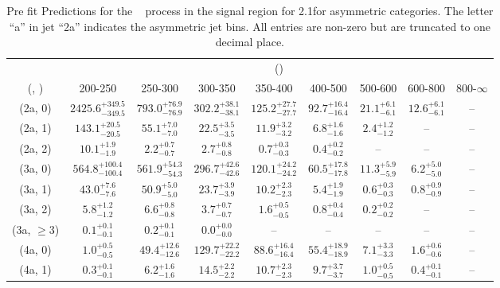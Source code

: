 \begin{table}[h!]
\tiny
\centering
\caption{Pre fit Predictions for the \zInv~ process in the signal region for 2.1\ifb for asymmetric categories. The letter ``a'' in jet \eg ``2a''  indicates the asymmetric jet bins. All entries are non-zero but are truncated to one decimal place.\label{tab:predsep_sig_zinv_asym}}
\begin{tabular}
{ccccccccc}
	\hline\hline
	& \multicolumn{8}{c}{\scalht (\gev)} \\ 
	 (\njet,  \nb) & 200-250 & 250-300 & 300-350 & 350-400 & 400-500 & 500-600 & 600-800 & 800-$\infty$ \\ [0.8ex] 
\hline
	(2a, 0) & $2425.6^{+ 349.5 }_{- 349.5 }$ & $793.0^{+ 76.9 }_{- 76.9 }$ & $302.2^{+ 38.1 }_{- 38.1 }$ & $125.2^{+ 27.7 }_{- 27.7 }$ & $92.7^{+ 16.4 }_{- 16.4 }$ & $21.1^{+ 6.1 }_{- 6.1 }$ & $12.6^{+ 6.1 }_{- 6.1 }$ & -- \\[0.5ex] 
	(2a, 1) & $143.1^{+ 20.5 }_{- 20.5 }$ & $55.1^{+ 7.0 }_{- 7.0 }$ & $22.5^{+ 3.5 }_{- 3.5 }$ & $11.9^{+ 3.2 }_{- 3.2 }$ & $6.8^{+ 1.6 }_{- 1.6 }$ & $2.4^{+ 1.2 }_{- 1.2 }$ & -- & -- \\[0.5ex] 
	(2a, 2) & $10.1^{+ 1.9 }_{- 1.9 }$ & $2.2^{+ 0.7 }_{- 0.7 }$ & $2.7^{+ 0.8 }_{- 0.8 }$ & $0.7^{+ 0.3 }_{- 0.3 }$ & $0.4^{+ 0.2 }_{- 0.2 }$ & -- & -- & -- \\[0.5ex] 
	(3a, 0) & $564.8^{+ 100.4 }_{- 100.4 }$ & $561.9^{+ 54.3 }_{- 54.3 }$ & $296.7^{+ 42.6 }_{- 42.6 }$ & $120.1^{+ 24.2 }_{- 24.2 }$ & $60.5^{+ 17.8 }_{- 17.8 }$ & $11.3^{+ 5.9 }_{- 5.9 }$ & $6.2^{+ 5.0 }_{- 5.0 }$ & -- \\[0.5ex] 
	(3a, 1) & $43.0^{+ 7.6 }_{- 7.6 }$ & $50.9^{+ 5.0 }_{- 5.0 }$ & $23.7^{+ 3.9 }_{- 3.9 }$ & $10.2^{+ 2.3 }_{- 2.3 }$ & $5.4^{+ 1.9 }_{- 1.9 }$ & $0.6^{+ 0.3 }_{- 0.3 }$ & $0.8^{+ 0.9 }_{- 0.9 }$ & -- \\[0.5ex] 
	(3a, 2) & $5.8^{+ 1.2 }_{- 1.2 }$ & $6.6^{+ 0.8 }_{- 0.8 }$ & $3.7^{+ 0.7 }_{- 0.7 }$ & $1.6^{+ 0.5 }_{- 0.5 }$ & $0.8^{+ 0.4 }_{- 0.4 }$ & $0.2^{+ 0.2 }_{- 0.2 }$ & -- & -- \\[0.5ex] 
	(3a, $\ge3$) & $0.1^{+ 0.1 }_{- 0.1 }$ & $0.2^{+ 0.1 }_{- 0.1 }$ & $0.0^{+ 0.0 }_{- 0.0 }$ & -- & -- & -- & -- & -- \\[0.5ex] 
	(4a, 0) & $1.0^{+ 0.5 }_{- 0.5 }$ & $49.4^{+ 12.6 }_{- 12.6 }$ & $129.7^{+ 22.2 }_{- 22.2 }$ & $88.6^{+ 16.4 }_{- 16.4 }$ & $55.4^{+ 18.9 }_{- 18.9 }$ & $7.1^{+ 3.3 }_{- 3.3 }$ & $1.6^{+ 0.6 }_{- 0.6 }$ & -- \\[0.5ex] 
	(4a, 1) & $0.3^{+ 0.1 }_{- 0.1 }$ & $6.2^{+ 1.6 }_{- 1.6 }$ & $14.5^{+ 2.2 }_{- 2.2 }$ & $10.7^{+ 2.3 }_{- 2.3 }$ & $9.7^{+ 3.7 }_{- 3.7 }$ & $1.0^{+ 0.5 }_{- 0.5 }$ & $0.4^{+ 0.1 }_{- 0.1 }$ & -- \\[0.5ex] 

\end{tabular}
\end{table}
